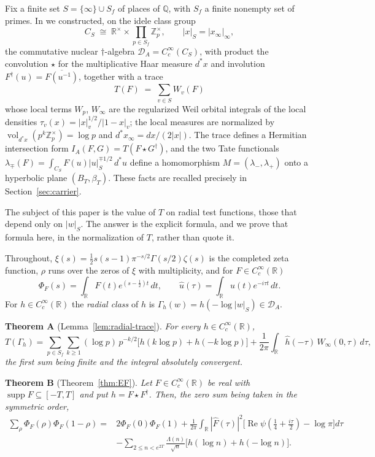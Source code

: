 \documentclass[11pt]{amsart}
\theoremstyle{definition}
\theoremstyle{remark}
\newcommand{\R}{\mathbb R}
\newcommand{\Z}{\mathbb Z}
\newcommand{\Q}{\mathbb Q}
\newcommand{\Rel}{\operatorname{Re}}
\newcommand{\supp}{\operatorname{supp}}
\newcommand{\vol}{\operatorname{vol}}
\newcommand{\DA}{\mathcal D_A}
\newcommand{\CS}{C_S}
\newcommand{\BT}{B_T}
\begin{document}
Fix a finite set $S=\{\infty\}\cup S_f$ of places of $\Q$, with $S_f$ a finite
nonempty set of primes.  In \cite{P43,P44} we constructed, on the idele class
group
\[
  \CS\;\cong\;\R^\times\times\prod_{p\in S_f}\Z_p^\times ,
  \qquad |x|_S=|x_\infty|_\infty ,
\]
the commutative nuclear $\dagger$-algebra $\DA=C_c^\infty(\CS)$, with product
the convolution $\star$ for the multiplicative Haar measure $d^*x$ and
involution $F^\dagger(u)=\overline{F(u^{-1})}$, together with a trace
\[
  T(F)\;=\;\sum_{v\in S}W_v(F)
\]
whose local terms $W_p$, $W_\infty$ are the regularized Weil orbital
integrals of the local densities $\tau_v(x)=|x|_v^{1/2}/|1-x|_v$; the local
measures are normalized by $\vol_{d^*x}(p^k\Z_p^\times)=\log p$ and
$d^*x_\infty=dx/(2|x|)$.  The trace defines a Hermitian intersection form
$I_A(F,G)=T(F\star G^\dagger)$, and the two Tate functionals
$\lambda_\mp(F)=\int_{\CS}F(u)|u|_S^{\mp1/2}\,d^*u$ define a homomorphism
$M=(\lambda_-,\lambda_+)$ onto a hyperbolic plane $(\BT,\beta_T)$.  These
facts are recalled precisely in Section~\ref{sec:carrier}.

The subject of this paper is the value of $T$ on radial test functions, those
that depend only on $|w|_S$.  The answer is the explicit formula, and we prove
that formula here, in the normalization of $T$, rather than quote it.

Throughout, $\xi(s)=\tfrac12 s(s-1)\pi^{-s/2}\Gamma(s/2)\zeta(s)$ is the
completed zeta function, $\rho$ runs over the zeros of $\xi$ with
multiplicity, and for $F\in C_c^\infty(\R)$
\[
  \Phi_F(s)=\int_\R F(t)e^{(s-\frac12)t}\,dt ,\qquad
  \hat u(\tau)=\int_\R u(t)e^{-i\tau t}\,dt .
\]
For $h\in C_c^\infty(\R)$ the \emph{radial class} of $h$ is
$\Gamma_h(w)=h(-\log|w|_S)\in\DA$.

\medskip
\noindent\textbf{Theorem A} (Lemma~\ref{lem:radial-trace}).
\emph{For every $h\in C_c^\infty(\R)$,}
\[
  T(\Gamma_h)=\sum_{p\in S_f}\sum_{k\ge1}(\log p)\,p^{-k/2}
      \bigl[h(k\log p)+h(-k\log p)\bigr]
      +\frac1{2\pi}\int_\R \hat h(-\tau)\,\widehat W_\infty(0,\tau)\,d\tau ,
\]
\emph{the first sum being finite and the integral absolutely convergent.}

\medskip
\noindent\textbf{Theorem B} (Theorem~\ref{thm:EF}).
\emph{Let $F\in C_c^\infty(\R)$ be real with $\supp F\subseteq[-T,T]$ and put
$h=F\star F^\dagger$.  Then, the zero sum being taken in the symmetric order,}
\[
\begin{aligned}
  \sum_\rho\Phi_F(\rho)\Phi_F(1-\rho)
  ={}&2\Phi_F(0)\Phi_F(1)
   +\frac1{2\pi}\int_\R|\hat F(\tau)|^2
      \bigl[\Rel\psi(\tfrac14+\tfrac{i\tau}2)-\log\pi\bigr]d\tau\\
   &-\sum_{2\le n<e^{2T}}\frac{\Lambda(n)}{\sqrt n}
      \bigl[h(\log n)+h(-\log n)\bigr].
\end{aligned}
\]
\end{document}
